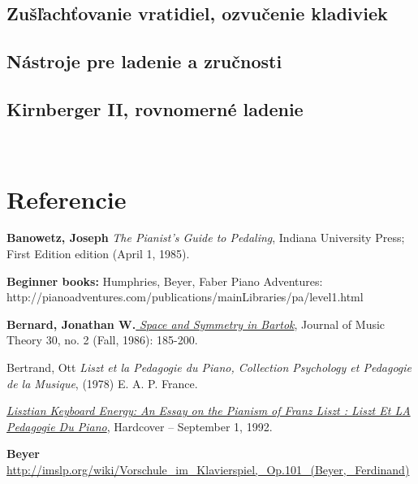 \documentclass[11pt,a4paper]{book}
\begin{document}
\section{Zušľachťovanie vratidiel, ozvučenie kladiviek}\label{s:maintenance}

\section{Nástroje pre ladenie a zručnosti}\label{s:tuning-tools}

\section{Kirnberger II, rovnomerné ladenie}\label{s:kirnberger-ii}
\ 


\chapter*{Referencie}\label{s:references}
\textbf{Banowetz, Joseph} \emph{The Pianist's
Guide to Pedaling}, Indiana University Press; First Edition edition
(April 1, 1985).

\textbf{\hypertarget{r:beginner-books}{Beginner books:}} {Humphries}, Beyer, Faber Piano Adventures: \\
http://pianoadventures.com/publications/mainLibraries/pa/level1.html

{\textbf{Bernard, Jonathan
W.}\href{http://www.bayarea.net/\%7Ekins/AboutMe/Bartok/Bartok_Annotated_Bib.html}{{
\emph{Space and Symmetry in Bartok}}}}, Journal of Music Theory 30, no.
2 (Fall, 1986): 185-200.

Bertrand\label{r:Bertrand}, Ott \emph{Liszt et la
Pedagogie du Piano, Collection Psychology et Pedagogie de la Musique},
(1978) E. A. P. France.

\href{http://www.amazon.com/Lisztian-Keyboard-Energy-Pianism-Pedagogie/dp/0773495894/ref=sr_1_2?ie=UTF8\&qid=1412867634\&sr=8-2\&keywords=Bertrand\%252C+Ott\%252C+Lisztian+Keyboard+Energy\%253A+An+Essay+on+the+Pianism+of+Franz+Liszt+\%253A+Liszt+Et+LA+Pedagogie+Du+Piano}{\emph{Lisztian
Keyboard Energy: An Essay on the Pianism of Franz Liszt : Liszt Et LA
Pedagogie Du Piano}}, Hardcover -- September 1, 1992.

{\textbf{Beyer
{~}}\href{http://imslp.org/wiki/Vorschule_im_Klavierspiel,_Op.101_\%28Beyer,_Ferdinand\%29}{{
http://imslp.org/wiki/Vorschule\_im\_Klavierspiel,\_Op.101\_(Beyer,\_Ferdinand)}}}
\end{document}
